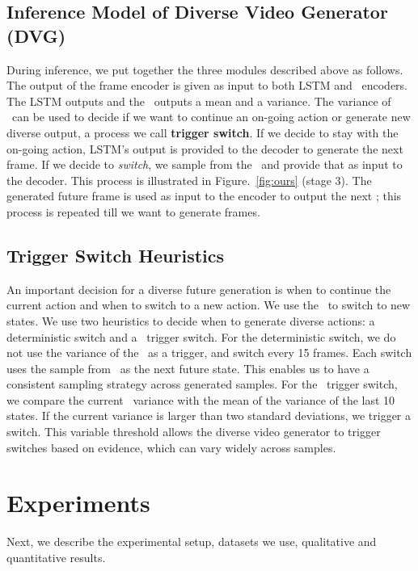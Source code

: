 \documentclass{article} \usepackage{iclr2021_conference,times}
\newcommand{\GP}{}
\begin{document}
\subsection{Inference Model of Diverse Video Generator (DVG)}
\vspace{-0.05in}
During inference, we put together the three modules described above as follows. The output of the frame encoder  is given as input to both LSTM and \GP\ encoders. The LSTM outputs  and the \GP\ outputs a mean and a variance. The variance of \GP\ can be used to decide if we want to continue an on-going action or generate new diverse output, a process we call \textbf{trigger switch}. If we decide to stay with the on-going action, LSTM's output  is provided to the decoder to generate the next frame. If we decide to \emph{switch}, we sample  from the \GP\ and provide that as input to the decoder. This process is illustrated in Figure.~\ref{fig:ours} (stage 3). The generated future frame is used as input to the encoder to output the next ; this process is repeated till we want to generate frames.

\vspace{-0.05in}
\subsection{Trigger Switch Heuristics}
\vspace{-0.05in}
An important decision for a diverse future generation is when to continue the current action and when to switch to a new action. We use the \GP\ to switch to new states. We use two heuristics to decide when to generate diverse actions: a deterministic switch and a \GP\ trigger switch. For the deterministic switch, we do not use the variance of the \GP\ as a trigger,  and switch every 15 frames. Each switch uses the sample from \GP\ as the next future state. This enables us to have a consistent sampling strategy across generated samples. For the \GP\ trigger switch, we compare the current \GP\ variance with the mean of the variance of the last 10 states. If the current variance is larger than two standard deviations, we trigger a switch. 
This variable threshold allows the diverse video generator to trigger switches based on evidence, which can vary widely across samples.

\section{Experiments}
\label{sec:exps}
Next, we describe the experimental setup, datasets we use, qualitative and quantitative results.
\end{document}
